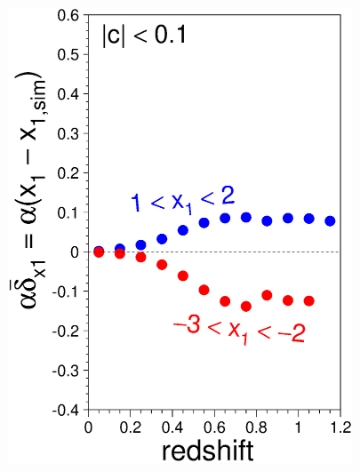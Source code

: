 \documentclass[11pt,a4paper]{paper}
\begin{document}
\begin{figure}
\begin{subfigure}[t]{.30\linewidth}
        \includegraphics[width=\linewidth]{Answer_figures/Fig_biasCor_x1.eps}
    \end{subfigure}
    \begin{subfigure}[t]{.30\linewidth}
        \centering

\end{subfigure}
\end{figure}
\end{document}
